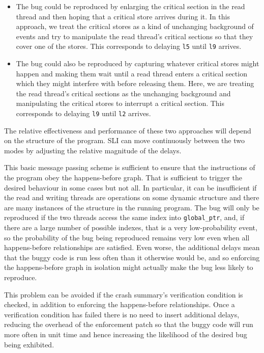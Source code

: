 \documentclass[12pt,a4paper]{book}
\begin{document}
\begin{itemize}
\item
  The bug could be reproduced by enlarging the critical section in the read thread and then hoping that a critical store arrives during it.
  In this approach, we treat the critical stores as a kind of unchanging background of events and try to manipulate the read thread's critical sections so that they cover one of the stores.
  This corresponds to delaying \verb|l5| until \verb|l9| arrives.
\item
  The bug could also be reproduced by capturing whatever critical stores might happen and making them wait until a read thread enters a critical section which they might interfere with before releasing them.
  Here, we are treating the read thread's critical sections as the unchanging background and manipulating the critical stores to interrupt a critical section.
  This corresponds to delaying \verb|l9| until \verb|l2| arrives.
\end{itemize}

The relative effectiveness and performance of these two approaches will depend on the structure of the program.
SLI can move continuously between the two modes by adjusting the relative magnitude of the delays.


This basic message passing scheme is sufficient to ensure that the instructions of the program obey the happens-before graph.
That is sufficient to trigger the desired behaviour in some cases but not all.
In particular, it can be insufficient if the read and writing threads are operations on some dynamic structure and there are many instances of the structure in the running program.
The bug will only be reproduced if the two threads access the same index into \verb|global_ptr|, and, if there are a large number of possible indexes, that is a very low-probability event, so the probability of the bug being reproduced remains very low even when all happens-before relationships are satisfied.
Even worse, the additional delays mean that the buggy code is run less often than it otherwise would be, and so enforcing the happens-before graph in isolation might actually make the bug less likely to reproduce.

This problem can be avoided if the crash summary's verification condition is checked, in addition to enforcing the happens-before relationships.
Once a verification condition has failed there is no need to insert additional delays, reducing the overhead of the enforcement patch so that the buggy code will run more often in unit time and hence increasing the likelihood of the desired bug being exhibited.
\end{document}
